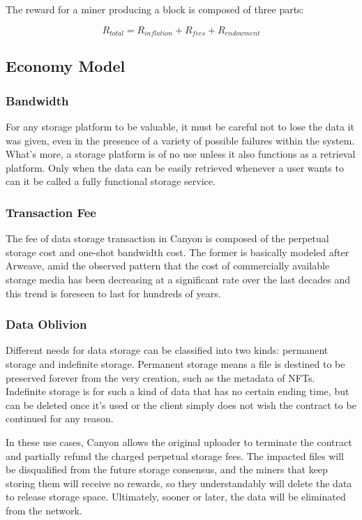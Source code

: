 \documentclass[]{article}
\newcounter{subsubsubsection}[subsubsection]
\begin{document}

The reward for a miner producing a block is composed of three parts:

$$
R_{total} = R_{inflation} + R_{fees} + R_{endowment}
$$

\subsection{Economy Model}

\subsubsection{Bandwidth}

For any storage platform to be valuable, it must be careful not to lose the data it was given, even in the presence of a variety of possible failures within the system. What's more, a storage platform is of no use unless it also functions as a retrieval platform. Only when the data can be easily retrieved whenever a user wants to can it be called a fully functional storage service.

\subsubsection{Transaction Fee}

The fee of data storage transaction in Canyon is composed of the perpetual storage cost and one-shot bandwidth cost. The former is basically modeled after Arweave, amid the observed pattern that the cost of commercially available storage media has been decreasing at a significant rate over the last decades and this trend is foreseen to last for hundreds of years.

\subsubsection{Data Oblivion}

Different needs for data storage can be classified into two kinds: permanent storage and indefinite storage. Permanent storage means a file is destined to be preserved forever from the very creation, such as the metadata of NFTs. Indefinite storage is for such a kind of data that has no certain ending time, but can be deleted once it's used or the client simply does not wish the contract to be continued for any reason.

In these use cases, Canyon allows the original uploader to terminate the contract and partially refund the charged perpetual storage fees. The impacted files will be disqualified from the future storage consensus, and the miners that keep storing them will receive no rewards, so they understandably will delete the data to release storage space. Ultimately, sooner or later, the data will be eliminated from the network.
\end{document}
